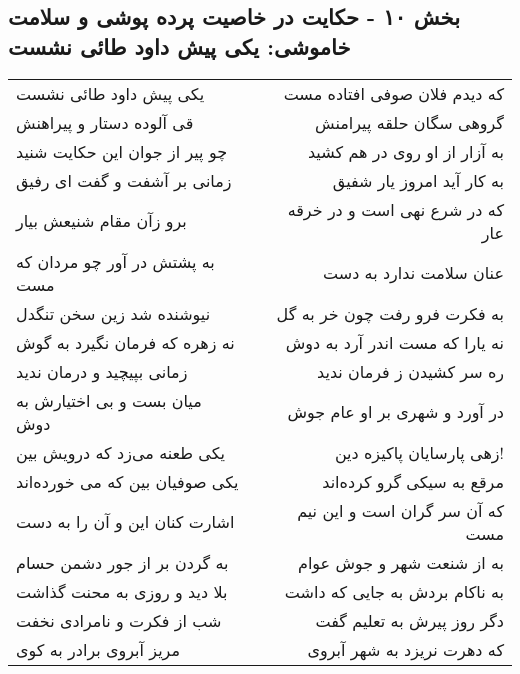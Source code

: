 \begin{center}
\section*{بخش ۱۰ - حکایت در خاصیت پرده پوشی و سلامت خاموشی: یکی پیش داود طائی نشست}
\label{sec:010}
\begin{longtable}{l p{0.5cm} r}
یکی پیش داود طائی نشست
&&
که دیدم فلان صوفی افتاده مست
\\
قی آلوده دستار و پیراهنش
&&
گروهی سگان حلقه پیرامنش
\\
چو پیر از جوان این حکایت شنید
&&
به آزار از او روی در هم کشید
\\
زمانی بر آشفت و گفت ای رفیق
&&
به کار آید امروز یار شفیق
\\
برو زآن مقام شنیعش بیار
&&
که در شرع نهی است و در خرقه عار
\\
به پشتش در آور چو مردان که مست
&&
عنان سلامت ندارد به دست
\\
نیوشنده شد زین سخن تنگدل
&&
به فکرت فرو رفت چون خر به گل
\\
نه زهره که فرمان نگیرد به گوش
&&
نه یارا که مست اندر آرد به دوش
\\
زمانی بپیچید و درمان ندید
&&
ره سر کشیدن ز فرمان ندید
\\
میان بست و بی اختیارش به دوش
&&
در آورد و شهری بر او عام جوش
\\
یکی طعنه می‌زد که درویش بین
&&
زهی پارسایان پاکیزه دین!
\\
یکی صوفیان بین که می خورده‌اند
&&
مرقع به سیکی گرو کرده‌اند
\\
اشارت کنان این و آن را به دست
&&
که آن سر گران است و این نیم مست
\\
به گردن بر از جور دشمن حسام
&&
به از شنعت شهر و جوش عوام
\\
بلا دید و روزی به محنت گذاشت
&&
به ناکام بردش به جایی که داشت
\\
شب از فکرت و نامرادی نخفت
&&
دگر روز پیرش به تعلیم گفت
\\
مریز آبروی برادر به کوی
&&
که دهرت نریزد به شهر آبروی
\\
\end{longtable}
\end{center}
